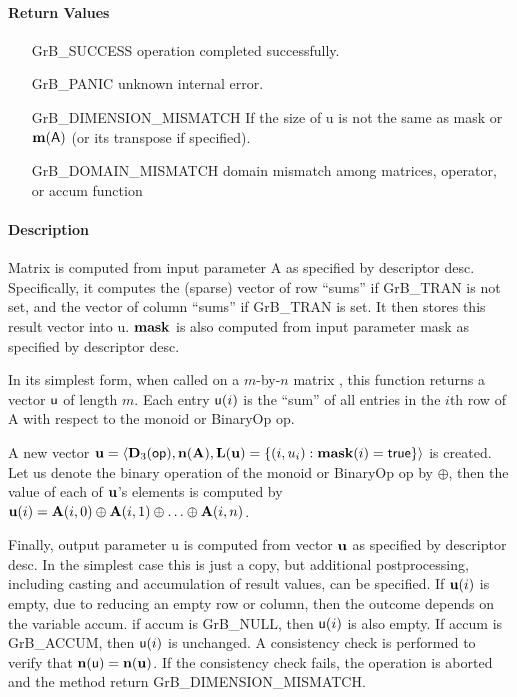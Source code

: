 \paragraph{Return Values}

\begin{itemize}[leftmargin=2.1in]
\item[{\sf GrB\_SUCCESS}]    operation completed successfully.
\item[{\sf GrB\_PANIC}]      unknown internal error.
\item[{\sf GrB\_DIMENSION\_MISMATCH}]            
        If the size of {\sf u} is not the same as {\sf mask} or $\bold{m}({\sf A})$ (or its transpose if specified).
\item[{\sf GrB\_DOMAIN\_MISMATCH}]  
        domain mismatch among matrices, operator, or
        accum function 
\end{itemize}


\paragraph{Description}

Matrix  is computed from input parameter {\sf A} as specified
by descriptor {\sf desc}. Specifically, it computes the (sparse) vector of row ``sums'' if 
GrB\_TRAN  is not set, and the vector of column ``sums'' if GrB\_TRAN  is set. It then
stores this result vector into {\sf u}. ${\bf mask}$ is also computed from input parameter {\sf mask}
as specified by descriptor {\sf desc}.

In its simplest form, when called on a $m$-by-$n$ matrix , this function returns a vector ${\sf u}$ 
of length $m$. Each entry ${\sf u}(i)$ is the ``sum'' of all entries in the $i$th row of 
{\sf A} with respect to the monoid or BinaryOp {\sf op}. 


A new vector ${\bf u} = \langle \bold{D}_3({\sf op}),
\bold{n}({\bf A}), \bold{L}({\bf u}) = \{(i,u_i) : {\bf mask}(i)
= {\sf true} \} \rangle$ is created.  Let us denote the binary operation of the monoid or BinaryOp {\sf op} by $\oplus$,
then the value of each of ${\bf u}$'s elements
is computed by $ {\bf u}(i) = {\bf A}(i,0) \oplus {\bf A}(i,1) \oplus  \ldots \oplus  {\bf A}(i,n)$.  
 

Finally, output parameter {\sf u} is computed from vector ${\bf u}$
as specified by descriptor {\sf desc}. In the simplest case this
is just a copy, but additional postprocessing, including casting and
accumulation of result values, can be specified. 
 If ${\bf u}(i)$ is empty, due to reducing an empty row or column, then the outcome depends on the variable {\sf accum}.
  if {\sf accum} is GrB\_NULL, then ${\sf u}(i)$ is also empty. If {\sf accum} is GrB\_ACCUM, then ${\sf u}(i)$ is unchanged.
A consistency check is
performed to verify that $\bold{n}({\sf u}) = \bold{n}({\bf u})$. If
the consistency check fails, the operation is aborted and the method
return {\sf GrB\_DIMENSION\_MISMATCH}.


